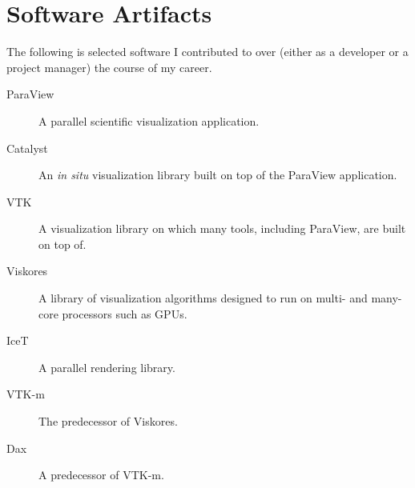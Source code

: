 \documentclass{article}
\begin{document}
\section*{Software Artifacts}

The following is selected software I contributed to over (either as a developer or a project manager) the course of my career.

\begin{description}
\item[ParaView] A parallel scientific visualization application.
\item[Catalyst] An \emph{in situ} visualization library built on top of the ParaView application.
\item[VTK] A visualization library on which many tools, including ParaView, are built on top of.
\item[Viskores] A library of visualization algorithms designed to run on multi- and many-core processors such as GPUs.
\item[IceT] A parallel rendering library.
\item[VTK-m] The predecessor of Viskores.
\item[Dax] A predecessor of VTK-m.
\end{description}
\end{document}
